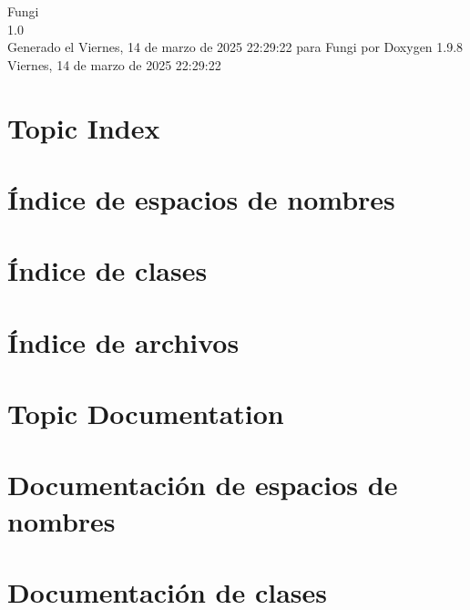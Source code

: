 \documentclass[twoside]{book}
\newcommand{\+}{\discretionary{\mbox{\scriptsize$\hookleftarrow$}}{}{}}
\newcommand{\clearemptydoublepage}{%
    \newpage{\pagestyle{empty}\cleardoublepage}%
  }
\begin{document}
  \raggedbottom
    \hypersetup{pageanchor=false,
                bookmarksnumbered=true,
                pdfencoding=unicode
               }
  \begin{titlepage}
  \vspace*{7cm}
  \begin{center}%
  {\Large Fungi}\\
  [1ex]\large 1.\+0 \\
  \vspace*{1cm}
  {\large Generado el Viernes, 14 de marzo de 2025 22\+:29\+:22 para Fungi por Doxygen 1.9.8}\\
    \vspace*{0.5cm}
    {\small Viernes, 14 de marzo de 2025 22:29:22}
  \end{center}
  \end{titlepage}
  \clearemptydoublepage
  \tableofcontents
  \clearemptydoublepage
  \hypersetup{pageanchor=true}

\chapter{Topic Index}

\chapter{Índice de espacios de nombres}

\chapter{Índice de clases}

\chapter{Índice de archivos}

\chapter{Topic Documentation}

\chapter{Documentación de espacios de nombres}



\chapter{Documentación de clases}










\end{document}
